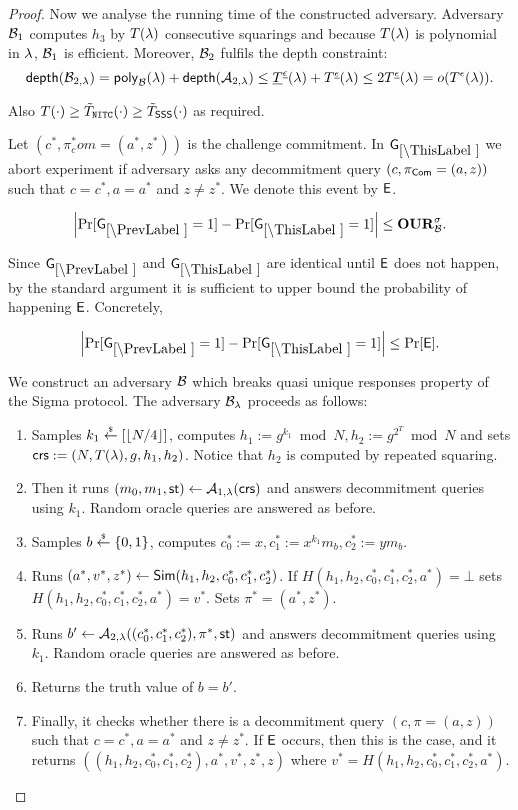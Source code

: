 \begin{proof}
Now we analyse the running time of the constructed adversary. Adversary $\mathcal{B}_1$ computes $h_3$ by $T(\lambda)$ consecutive squarings and because $T(\lambda)$ is polynomial in $\lambda$, $\mathcal{B}_1$ is efficient. Moreover, $\mathcal{B}_2$ fulfils the depth constraint:
\[ \mathsf{depth}(\mathcal{B}_{2,\lambda}) = \mathsf{poly}_{\mathcal{B}}(\lambda) + \mathsf{depth}(\mathcal{A}_{2,\lambda}) \leq \underline{T}^{\underline{\epsilon}}(\lambda) + T^{\underline{\epsilon}}(\lambda) \leq 2 T^{\underline{\epsilon}}(\lambda) = o(T^{\epsilon}(\lambda)). \] 

Also $T(\cdot) \geq \tilde{T}_{\mathtt{NITC}}(\cdot) \geq \tilde{T}_\mathsf{SSS}(\cdot)$ as required.  


Let $(c^*, \pi^*_com=(a^*,z^*))$ is the challenge commitment. In $\games_\thisgame$ we abort experiment if adversary asks any decommitment query $(c,\pi_{\mathsf{Com}}=(a,z))$ such that $c=c^*, a = a^*$ and $z \neq z^*$. We denote this event by $\mathsf{E}$.
\begin{lemma}
\[
\left|\Pr[\games_\prevgame = 1] - \Pr[\games_\thisgame = 1]\right| \leq \qur^\sigma_\advB.
\]
\end{lemma}


Since $\games_\prevgame$ and $\games_\thisgame$ are identical until $\mathsf{E}$ does not happen, by the standard argument it is sufficient to upper bound the probability of happening $\mathsf{E}$. Concretely,  

\[
\left|\Pr[\games_\prevgame = 1] - \Pr[\games_\thisgame = 1]\right| \leq \Pr[\event]. 
\]

We construct an adversary $\mathcal{B}$ which breaks quasi unique responses property of the Sigma protocol. 
The adversary $\mathcal{B}_{\lambda}$ proceeds as follows:
\vspace{-2mm}
\begin{enumerate}
\item Samples $k_1\stackrel{{\scriptscriptstyle\$}}{\leftarrow} [\left\lfloor N/4 \right\rfloor]$, computes $h_1 := g^{k_1} \bmod N, h_2:=g^{2^T} \bmod N$ and sets $\mathsf{crs}:=(N, T(\lambda), g, h_1, h_2)$. Notice that $h_2$ is computed by repeated squaring. 
\item Then it runs $(m_0, m_1, \mathsf{st}) \leftarrow \mathcal{A}_{1, \lambda}(\mathsf{crs})$ and answers decommitment queries using $k_1$. Random oracle queries are answered as before. 
\item Samples $b \stackrel{{\scriptscriptstyle\$}}{\leftarrow} \{0,1\}$, computes $c_0^*:=x, c_1^*:=x^{k_1} m_b, c_2^*:=y m_b$.
\item Runs $(a^*,v^*,z^*) \leftarrow \mathsf{Sim}(h_1, h_2, c_0^*, c_1^*, c_2^*)$. If $H(h_1, h_2, c_0^*, c_1^*, c_2^*,a^*) = \bot$ sets $H(h_1, h_2, c_0^*, c_1^*, c_2^*,a^*) = v^*$. Sets $\pi^* = (a^*,z^*)$.
\item Runs $b' \leftarrow \mathcal{A}_{2, \lambda}((c_0^*, c_1^*, c_2^*), \pi^*, \mathsf{st})$ and answers decommitment queries using $k_1$. Random oracle queries are answered as before. 
\item Returns the truth value of $b=b'$.
\item Finally, it checks whether there is a decommitment query $(c,\pi=(a,z))$ such that $c= c^*, a = a^*$ and $z \neq z^*$. If $\mathsf{E}$ occurs, then this is the case, and it returns $((h_1, h_2, c_0^*, c_1^*, c_2^*),a^*,v^*,z^*,z)$ where $v^* = H(h_1, h_2, c_0^*, c_1^*, c_2^*,a^*)$.
\end{enumerate}


\end{proof}
